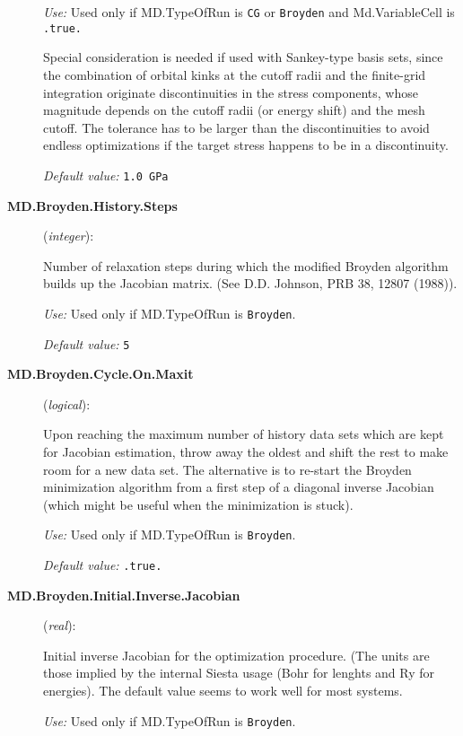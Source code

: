 \documentclass[11pt]{article}
\begin{document}
\begin{description}
{\it Use:} Used only if MD.TypeOfRun is {\tt CG} or {\tt Broyden} and
Md.VariableCell is {\tt .true.}

Special consideration is needed if used with Sankey-type basis sets, since 
the combination of orbital kinks at the cutoff radii and the finite-grid
integration originate discontinuities in the
stress components, whose magnitude depends on the cutoff radii (or 
energy shift) and the mesh cutoff. The tolerance has to be larger
than the discontinuities to avoid endless optimizations if the target
stress happens to be in a discontinuity.
   
{\it Default value:} {\tt 1.0 GPa}
 

\item [{\bf MD.Broyden.History.Steps}] ({\it integer}):

Number of relaxation steps during which the modified Broyden algorithm builds up
the Jacobian matrix. (See D.D. Johnson, PRB 38, 12807
(1988)).

{\it Use:} Used only if MD.TypeOfRun is {\tt Broyden}. 

{\it Default value:} {\tt 5}

\item [{\bf MD.Broyden.Cycle.On.Maxit}] ({\it logical}):

Upon reaching the maximum number of history data sets which are kept
for Jacobian estimation, throw away the oldest and shift the rest to
make room for a new data set. The alternative is to re-start the
Broyden minimization algorithm from a first step of a diagonal inverse
Jacobian (which might be useful when the minimization is
stuck). 

{\it Use:} Used only if MD.TypeOfRun is {\tt Broyden}. 

{\it Default value:} {\tt .true.}

\item[{\bf MD.Broyden.Initial.Inverse.Jacobian}] ({\it real}):

Initial inverse Jacobian for the optimization procedure. (The units 
are those implied by the internal Siesta usage (Bohr for lenghts and
Ry for energies). The default value seems to work well for most systems.

{\it Use:} Used only if MD.TypeOfRun is {\tt Broyden}. 


\end{description}
\end{document}
